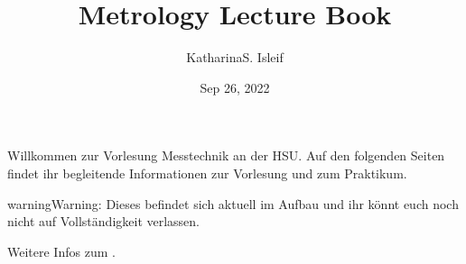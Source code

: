\documentclass[letterpaper,10pt,english]{jupyterBook}
\title{Metrology Lecture Book}
\date{Sep 26, 2022}
\author{Katharina\sphinxhyphen{}S.\@{} Isleif}
\begin{document}
\pagestyle{empty}
\sphinxmaketitle
\pagestyle{plain}
\sphinxtableofcontents
\pagestyle{normal}
\label{\detokenize{intro::doc}}


\sphinxAtStartPar
Willkommen zur Vorlesung Messtechnik an der HSU. Auf den folgenden Seiten findet ihr begleitende Informationen zur Vorlesung und zum Praktikum.

\begin{sphinxadmonition}{warning}{Warning:}
\sphinxAtStartPar
Dieses  befindet sich aktuell im Aufbau und ihr könnt euch noch nicht auf Vollständigkeit verlassen.
\end{sphinxadmonition}


\nopagebreak


\sphinxAtStartPar
Weitere Infos zum {\hyperref[\detokenize{content/00_jupyter::doc}]{}}.
\end{document}
